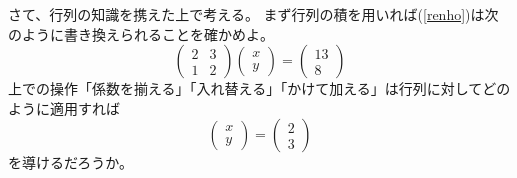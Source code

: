 \documentclass[10pt]{jsarticle}
\theoremstyle{definition}%
\newcommand{\kakko}[1]{\left(#1 \right)} %
\numberwithin{equation}{section}%
\begin{document}
さて、行列の知識を携えた上で考える。
まず行列の積を用いれば(\ref{renho})は次のように書き換えられることを確かめよ。
\begin{equation}
  \kakko{\begin{matrix}
    2 & 3\\
    1 & 2
  \end{matrix}}
  \kakko{\begin{matrix}
    x\\
    y
  \end{matrix}}
  =
  \kakko{\begin{matrix}
    13\\
    8
  \end{matrix}}
\end{equation}
上での操作「係数を揃える」「入れ替える」「かけて加える」は行列に対してどのように適用すれば
\begin{equation}
  \kakko{\begin{matrix}
    x\\
    y
  \end{matrix}}
  =\kakko{\begin{matrix}
    2\\
    3
  \end{matrix}}
\end{equation}
を導けるだろうか。
\end{document}
